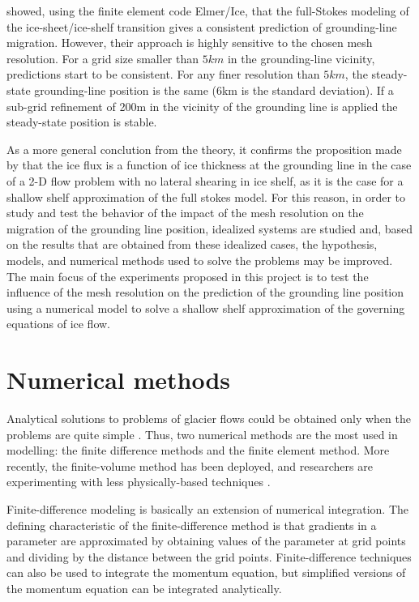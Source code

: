 \documentclass{article}
\begin{document}
\cite{durand2009full} showed, using the finite element code Elmer/Ice, that the full-Stokes modeling of the ice-sheet/ice-shelf transition gives a consistent prediction of grounding-line migration. However, their approach is highly sensitive to the chosen mesh resolution. For a grid size smaller than $5 km$ in the grounding-line vicinity, predictions start to be consistent. For any finer resolution than $5 km$, the steady-state grounding-line position is the same (6km is the standard deviation). If a sub-grid refinement of 200m in the vicinity of the grounding line is applied the steady-state position is stable.

As a more general conclution from the theory, it confirms the proposition made by \cite{weertman1974stability} that the ice flux is a function of ice thickness at the grounding line in the case of a 2-D flow problem with no lateral shearing in ice shelf, as it is the case for a shallow shelf approximation of the full stokes model. For this reason, in order to study and test the behavior of the impact of the mesh resolution on the migration of the grounding line position, idealized systems are studied and, based on the results that are obtained from these idealized cases, the hypothesis, models, and numerical methods used to solve the problems may be improved. The main focus of the experiments proposed in this project is to test the influence of the mesh resolution on the prediction of the grounding line position using a numerical model to solve a shallow shelf approximation of the governing equations of ice flow. 

\section{Numerical methods}

Analytical solutions to problems of glacier flows could be obtained only when the problems are quite simple \cite{hooke2019principles}. Thus, two numerical methods are the most used in modelling: the finite difference methods and the finite element method. More recently, the finite-volume method has been deployed, and researchers are experimenting with less physically-based techniques \cite{hooke2019principles}.

Finite-difference modeling is basically an extension of numerical integration. The deﬁning characteristic of the ﬁnite-difference method is that gradients in a parameter are approximated by obtaining values of the parameter at grid points and dividing by the distance between the grid points. Finite-difference techniques can also be used to integrate the momentum equation, but simpliﬁed versions of the momentum equation can be integrated analytically.
\end{document}

